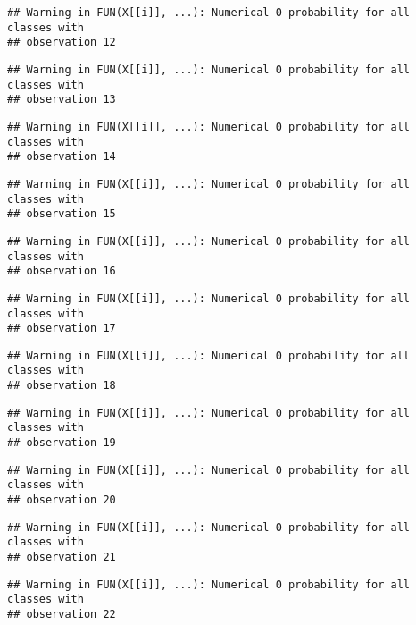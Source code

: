 \documentclass[
]{article}
\begin{document}
\begin{verbatim}
## Warning in FUN(X[[i]], ...): Numerical 0 probability for all classes with
## observation 12
\end{verbatim}

\begin{verbatim}
## Warning in FUN(X[[i]], ...): Numerical 0 probability for all classes with
## observation 13
\end{verbatim}

\begin{verbatim}
## Warning in FUN(X[[i]], ...): Numerical 0 probability for all classes with
## observation 14
\end{verbatim}

\begin{verbatim}
## Warning in FUN(X[[i]], ...): Numerical 0 probability for all classes with
## observation 15
\end{verbatim}

\begin{verbatim}
## Warning in FUN(X[[i]], ...): Numerical 0 probability for all classes with
## observation 16
\end{verbatim}

\begin{verbatim}
## Warning in FUN(X[[i]], ...): Numerical 0 probability for all classes with
## observation 17
\end{verbatim}

\begin{verbatim}
## Warning in FUN(X[[i]], ...): Numerical 0 probability for all classes with
## observation 18
\end{verbatim}

\begin{verbatim}
## Warning in FUN(X[[i]], ...): Numerical 0 probability for all classes with
## observation 19
\end{verbatim}

\begin{verbatim}
## Warning in FUN(X[[i]], ...): Numerical 0 probability for all classes with
## observation 20
\end{verbatim}

\begin{verbatim}
## Warning in FUN(X[[i]], ...): Numerical 0 probability for all classes with
## observation 21
\end{verbatim}

\begin{verbatim}
## Warning in FUN(X[[i]], ...): Numerical 0 probability for all classes with
## observation 22
\end{verbatim}
\end{document}
